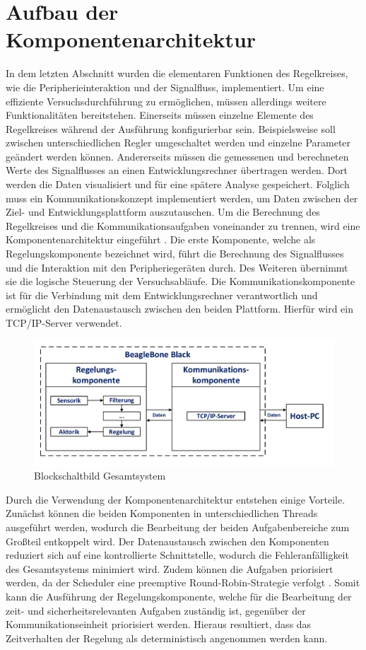 \section{Aufbau der Komponentenarchitektur}
In dem letzten Abschnitt wurden die elementaren Funktionen des Regelkreises, wie die Peripherieinteraktion und der Signalfluss, implementiert. Um eine effiziente Versuchsdurchführung zu ermöglichen, müssen allerdings weitere Funktionalitäten bereitstehen. Einerseits müssen einzelne Elemente des Regelkreises während der Ausführung konfigurierbar sein. Beispielsweise soll zwischen unterschiedlichen Regler umgeschaltet werden und einzelne Parameter geändert werden können. Andererseits müssen die gemessenen und berechneten Werte des Signalflusses an einen Entwicklungsrechner übertragen werden. Dort werden die Daten visualisiert und für eine spätere Analyse gespeichert.
Folglich muss ein Kommunikationskonzept implementiert werden, um Daten zwischen der Ziel- und Entwicklungsplattform auszutauschen. Um die Berechnung des Regelkreises und die Kommunikationsaufgaben voneinander zu trennen, wird eine Komponentenarchitektur eingeführt \cite[S. 279 ff.]{Wietzke1}. Die erste Komponente, welche als Regelungskomponente bezeichnet wird, führt die Berechnung des Signalflusses und die Interaktion mit den Peripheriegeräten durch. Des Weiteren übernimmt sie die logische Steuerung der Versuchsabläufe. Die Kommunikationskomponente ist für die Verbindung mit dem Entwicklungsrechner verantwortlich und ermöglicht den Datenaustausch zwischen den beiden Plattform. Hierfür wird ein TCP/IP-Server verwendet.
\begin{figure}[!h]
\centering
\includegraphics[width=\linewidth]{img/SW_1_KA_BSB.pdf}
\caption{Blockschaltbild Gesamtsystem}
\end{figure}
Durch die Verwendung der Komponentenarchitektur entstehen einige Vorteile. Zunächst können die beiden Komponenten in unterschiedlichen Threads ausgeführt werden, wodurch die Bearbeitung der beiden Aufgabenbereiche zum Großteil entkoppelt wird. Der Datenaustausch zwischen den Komponenten reduziert sich auf eine kontrollierte Schnittstelle, wodurch die Fehleranfälligkeit des Gesamtsystems minimiert wird. Zudem können die Aufgaben priorisiert werden, da der Scheduler eine preemptive Round-Robin-Strategie verfolgt \cite[S. 19]{Wietzke1}. Somit kann die Ausführung der Regelungskomponente, welche für die Bearbeitung der zeit- und sicherheitsrelevanten Aufgaben zuständig ist, gegenüber der Kommunikationseinheit priorisiert werden. Hieraus resultiert, dass das Zeitverhalten der Regelung als deterministisch angenommen werden kann. 

